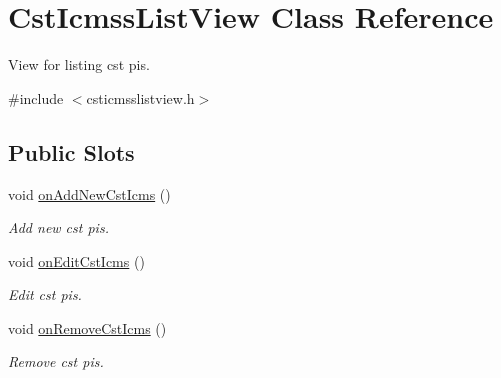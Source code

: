 \hypertarget{class_cst_icmss_list_view}{\section{\-Cst\-Icmss\-List\-View \-Class \-Reference}
\label{class_cst_icmss_list_view}
}


\-View for listing cst pis.  




{\ttfamily \#include $<$csticmsslistview.\-h$>$}

\subsection*{\-Public \-Slots}
\begin{DoxyCompactItemize}
\item 
void \hyperlink{class_cst_icmss_list_view_a44daecc60ba0c081fa54eeb4fef31862}{on\-Add\-New\-Cst\-Icms} ()
\begin{DoxyCompactList}\small\item\em \-Add new cst pis. \end{DoxyCompactList}\item 
void \hyperlink{class_cst_icmss_list_view_a4267a47fdd289b018e71c0820ddb5ffc}{on\-Edit\-Cst\-Icms} ()
\begin{DoxyCompactList}\small\item\em \-Edit cst pis. \end{DoxyCompactList}\item 
void \hyperlink{class_cst_icmss_list_view_a6160ac2c99ae9e14132cbec2551c394f}{on\-Remove\-Cst\-Icms} ()
\begin{DoxyCompactList}\small\item\em \-Remove cst pis. \end{DoxyCompactList}\end{DoxyCompactItemize}
